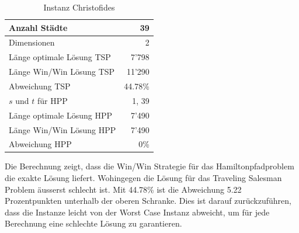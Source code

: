 \documentclass[11pt,a4paper]{article}
\begin{document}
        \begin{table}[H]
                \centering
                \begin{tabular}{| l | r |}
                    \hline
                        Anzahl Städte               & 39            \\ \hline
                        Dimensionen                 & 2             \\ \hline
                        Länge optimale Lösung TSP   & 7'798         \\ \hline
                        Länge Win/Win Lösung  TSP   & 11'290        \\ \hline
                        Abweichung TSP              & 44.78\%       \\ \hline
                        $s$ und $t$ für HPP         & 1, 39         \\ \hline
                        Länge optimale Lösung HPP   & 7'490         \\ \hline
                        Länge Win/Win Lösung  HPP   & 7'490         \\ \hline
                        Abweichung HPP              & 0\%           \\ \hline
                \end{tabular}
                \caption{Instanz Christofides}
                \label{tab:instanz_christofides}
        \end{table}

Die Berechnung zeigt, dass die Win/Win Strategie für das Hamiltonpfadproblem die exakte Lösung liefert. Wohingegen die Lösung für das Traveling Salesman Problem äusserst schlecht ist. Mit 44.78\% ist die Abweichung 5.22 Prozentpunkten unterhalb der oberen Schranke. Dies ist darauf zurückzuführen, dass die Instanze leicht von der Worst Case Instanz abweicht, um für jede Berechnung eine schlechte Lösung zu garantieren.
\end{document}
